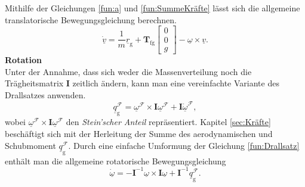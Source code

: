 Mithilfe der Gleichungen \ref{fun:a} und \ref{fun:SummeKräfte} lässt sich die allgemeine translatorische Bewegungsgleichung berechnen.
\begin{equation}
\label{fund:TranslatGL}
\underline{\dot{v}} = \dfrac{1}{m}\underline{r}_\mathrm{g} + \textbf{T}_\mathrm{fg}\begin{bmatrix} 
0\\
0\\
g
\end{bmatrix} - \underline{\omega}\times\underline{v}.
\end{equation}
\textbf{Rotation}\\
Unter der Annahme, dass sich weder die Massenverteilung noch die Trägheitsmatrix $\textbf{I}$  zeitlich ändern, kann man eine vereinfachte Variante des Drallsatzes anwenden.
\begin{equation}
\label{fun:Drallsatz}
\underline{q}^\mathcal{F}_\mathrm{g} =  \underline{\omega}^\mathcal{F}\times\textbf{I}\underline{\omega}^\mathcal{F} + \textbf{I}\underline{\dot{\omega}}^\mathcal{F},
\end{equation} 
wobei $ \underline{\omega}^\mathcal{F}\times\textbf{I}\underline{\omega}^\mathcal{F}$ den \textit{Stein'scher Anteil} repräsentiert. Kapitel \ref{sec:Kräfte} beschäftigt sich mit der Herleitung der Summe des aerodynamischen und Schubmoment $\underline{q}^\mathcal{F}_\mathrm{g}$. Durch eine einfache Umformung der Gleichung \ref{fun:Drallsatz} enthält man die allgemeine rotatorische Bewegungsgleichung
\begin{equation}
\label{fund:RotGL}
\underline{\dot{\omega}} = -\textbf{I}^{-1}\underline{\omega}\times\textbf{I}\underline{\omega} + \textbf{I}^{-1}\underline{q}^\mathcal{F}_\mathrm{g}.
\end{equation} 

